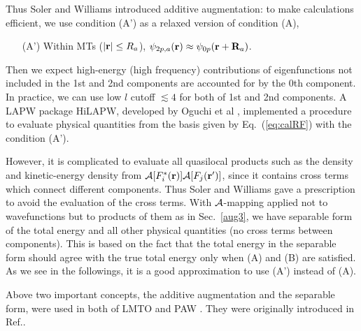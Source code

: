 \documentclass[twocolumn,showpacs,preprintnumbers,amsmath,amssymb,floatfix]{revtex4-1}
\newcommand{\bfr}{{\bf r}}
\newcommand{\bfR}{{\bf R}}
\def\calR{{\cal A}}
\newcommand{\req}[1]{\mbox{Eq.~\!(\ref{#1})}}
\newcommand{\refsec}[1]{\mbox{Sec.~\!\ref{#1}}}
\begin{document}
Thus Soler and Williams \cite{soler89} introduced additive augmentation:
to make calculations efficient, we use condition (A') as a 
relaxed version of condition (A),
\begin{itemize}
\item[(A')]
Within MTs ($|\bfr|\leq R_a$), 
$\psi_{2p,a}(\bfr) \approx \psi_{0p}(\bfr+\bfR_a)$.
\end{itemize}
Then we expect high-energy (high frequency) contributions
of eigenfunctions not included in the 1st and 2nd components 
are accounted for by the 0th component. In practice, we can use low $l$ 
cutoff $\lesssim 4$ for both of 1st and 2nd components. 
A LAPW package HiLAPW, developed by Oguchi et al \cite{PhysRevB.54.1159},
implemented a procedure to evaluate physical quantities from 
the basis given by \req{eq:calRF} with the condition (A').

However, it is complicated to evaluate all quasilocal 
products such as the density and kinetic-energy density
from $\calR[F^*_i(\bfr)]\calR[F_j(\bfr')]$,
since it contains cross terms which connect different components.
Thus Soler and Williams \cite{soler89} 
gave a prescription to avoid the evaluation of the cross terms.
With $\calR$-mapping applied not to wavefunctions
but to products of them as in \refsec{aug3},
we have {separable form} of the 
total energy and all other physical quantities 
(no cross terms between components). This is based on the fact that
the total energy in the {separable form} should 
agree with the true total energy only when (A) and (B) are satisfied. 
As we see in the followings, it is a good approximation to use (A') instead of (A). 

Above two important concepts, 
the additive augmentation and the separable form, 
were used in both of LMTO and PAW \cite{lmfchap,PAW,kresse99}.
They were originally introduced in Ref.\cite{soler89}.
\end{document}
